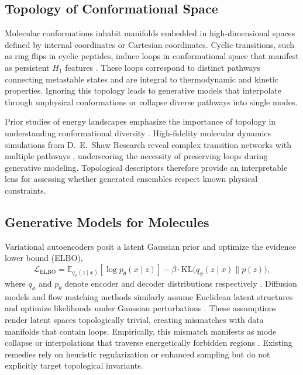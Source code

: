 \documentclass[11pt]{article}
\begin{document}
\subsection{Topology of Conformational Space}
Molecular conformations inhabit manifolds embedded in high-dimensional spaces defined by internal coordinates or Cartesian coordinates. Cyclic transitions, such as ring flips in cyclic peptides, induce loops in conformational space that manifest as persistent $H_1$ features \cite{wales2001microscopic, shaw2010atomic}. These loops correspond to distinct pathways connecting metastable states and are integral to thermodynamic and kinetic properties. Ignoring this topology leads to generative models that interpolate through unphysical conformations or collapse diverse pathways into single modes.

Prior studies of energy landscapes emphasize the importance of topology in understanding conformational diversity \cite{wales2001microscopic}. High-fidelity molecular dynamics simulations from D.~E.~Shaw Research reveal complex transition networks with multiple pathways \cite{shaw2010atomic}, underscoring the necessity of preserving loops during generative modeling. Topological descriptors therefore provide an interpretable lens for assessing whether generated ensembles respect known physical constraints.

\subsection{Generative Models for Molecules}
Variational autoencoders posit a latent Gaussian prior and optimize the evidence lower bound (ELBO),
\begin{equation}
    \mathcal{L}_{\text{ELBO}} = \mathbb{E}_{q_\phi(z \mid x)} [\log p_\theta(x \mid z)] - \beta \cdot \mathrm{KL}\big(q_\phi(z \mid x) \big\| p(z)\big),
    \label{eq:elbo}
\end{equation}
where $q_\phi$ and $p_\theta$ denote encoder and decoder distributions respectively \cite{kingma2014auto}. Diffusion models and flow matching methods similarly assume Euclidean latent structures and optimize likelihoods under Gaussian perturbations \cite{song2021score, lipman2023flow}. These assumptions render latent spaces topologically trivial, creating mismatches with data manifolds that contain loops. Empirically, this mismatch manifests as mode collapse or interpolations that traverse energetically forbidden regions \cite{noe2019boltzmann, trippe2023diffusion}. Existing remedies rely on heuristic regularization or enhanced sampling but do not explicitly target topological invariants.
\end{document}
